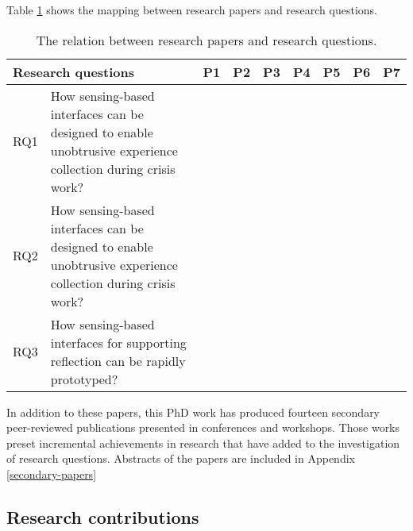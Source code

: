 Table \ref{tab:rq-papers-relation} shows the mapping between research papers and research questions.
\begin{table}
	[tbh] \centering \caption{The relation between research papers and research questions.} \label{tab:rq-papers-relation} 
	\begin{tabular}
		{p{}p{}ccccccc} \toprule \multicolumn{2}{l}{Research questions} & P1 & P2 & P3 & P4 & P5 & P6 & P7 \\
		\midrule RQ1 & How sensing-based interfaces can be designed to enable unobtrusive experience collection during crisis work? & & \textbullet & \textbullet & & & \textbullet & \\
		RQ2 & How sensing-based interfaces can be designed to enable unobtrusive experience collection during crisis work? & \textbullet & \textbullet & & \textbullet & \textbullet & \textbullet & \\
		RQ3 & How sensing-based interfaces for supporting reflection can be rapidly prototyped? & & & \textbullet & & \textbullet & & \textbullet \\
		\bottomrule 
	\end{tabular}
\end{table}

In addition to these papers, this PhD work has produced fourteen secondary peer-reviewed publications presented in conferences and workshops. Those works preset incremental achievements in research that have added to the investigation of research questions. Abstracts of the papers are included in Appendix \ref{secondary-papers}

\subsection{Research contributions}\label{research-contributions}

